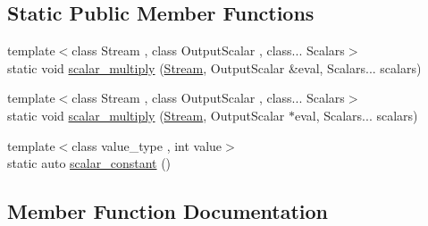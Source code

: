 \subsection*{Static Public Member Functions}
\begin{DoxyCompactItemize}
\item 
{\footnotesize template$<$class Stream , class Output\+Scalar , class... Scalars$>$ }\\static void \hyperlink{structbc_1_1tensors_1_1exprs_1_1blas__expression__parser_1_1Blas__Expression__Parser_3_01host__tag_01_4_a56ca3d5a1112006826bd9dad1315ae93}{scalar\+\_\+multiply} (\hyperlink{classbc_1_1streams_1_1Stream}{Stream}, Output\+Scalar \&eval, Scalars... scalars)
\item 
{\footnotesize template$<$class Stream , class Output\+Scalar , class... Scalars$>$ }\\static void \hyperlink{structbc_1_1tensors_1_1exprs_1_1blas__expression__parser_1_1Blas__Expression__Parser_3_01host__tag_01_4_a2481598673f239189642a2f3a7c33c68}{scalar\+\_\+multiply} (\hyperlink{classbc_1_1streams_1_1Stream}{Stream}, Output\+Scalar $\ast$eval, Scalars... scalars)
\item 
{\footnotesize template$<$class value\+\_\+type , int value$>$ }\\static auto \hyperlink{structbc_1_1tensors_1_1exprs_1_1blas__expression__parser_1_1Blas__Expression__Parser_3_01host__tag_01_4_a6ee7eaa8f7fa0387acede1b7ac124eb6}{scalar\+\_\+constant} ()
\end{DoxyCompactItemize}


\subsection{Member Function Documentation}
\mbox{\label{structbc_1_1tensors_1_1exprs_1_1blas__expression__parser_1_1Blas__Expression__Parser_3_01host__tag_01_4_a6ee7eaa8f7fa0387acede1b7ac124eb6}} 
